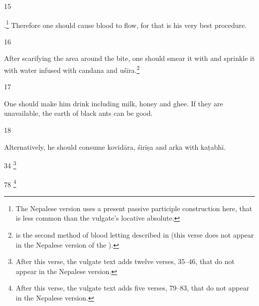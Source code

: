 \begin{translation}
\item [15] 

.\footnote{The
    Nepalese version uses a present passive participle construction here,
    that is less common than the vulgate's locative absolute.} Therefore one
    should cause blood to flow, for that is his very best procedure.

\item [16]  

After scarifying the area around the bite, one should 
smear it with  and sprinkle it with water infused with 
\gls{candana} and 
\gls{uśīra}.\footnote{ is the second method of 
blood letting  described in  (this verse does not appear in the 
Nepalese version of the \SS).}

\item [17]

One should make him drink  including milk, honey and 
ghee. If they are unavailable, the earth of black ants can be good. 


\item [18]

Alternatively, he should consume \gls{kovidāra}, \gls{śirīṣa} and
\gls{arka} with \gls{kaṭabhī}.

    
    \strut
    \bigskip
    
    \item[34] \footnote{After this verse, the vulgate text adds twelve
    verses, 35--46, that do not appear in the Nepalese version.}
    
     \item[78] \footnote{After this verse, the vulgate text adds five
        verses, 79--83, that do not appear in the Nepalese version.}
\end{translation}    
